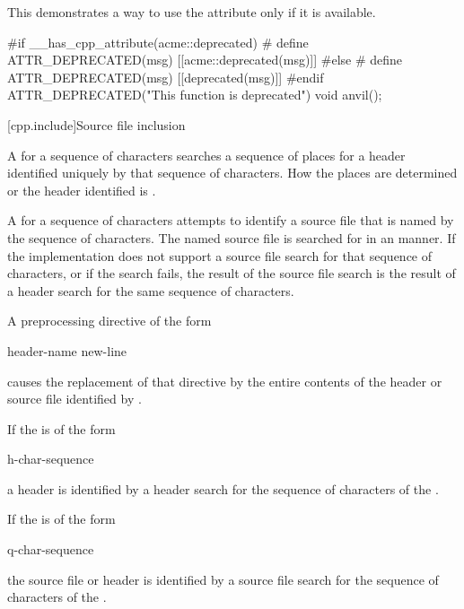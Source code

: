 \pnum
\begin{example}
This demonstrates a way to use the attribute 
only if it is available.
\begin{codeblock}
#if __has_cpp_attribute(acme::deprecated)
#  define ATTR_DEPRECATED(msg) [[acme::deprecated(msg)]]
#else
#  define ATTR_DEPRECATED(msg) [[deprecated(msg)]]
#endif
ATTR_DEPRECATED("This function is deprecated") void anvil();
\end{codeblock}
\end{example}

[cpp.include]{Source file inclusion}
%
%

\pnum
A  for a sequence of characters
searches a sequence of places for a header
identified uniquely by that sequence of characters.
How the places are determined or the header identified
is .

\pnum
A  for a sequence of characters
attempts to identify a source file that is named by the sequence of characters.
The named source file is searched for
in an  manner.
If the implementation does not support a source file search
for that sequence of characters, or if the search fails,
the result of the source file search
is the result of a header search for the same sequence of characters.

\pnum
A preprocessing directive of the form
\begin{ncsimplebnf}
 header-name new-line
\end{ncsimplebnf}
causes the replacement of that directive by the entire contents
of the header or source file identified by .

\pnum
If the  is of the form
\begin{ncsimplebnf}
\terminal{<} h-char-sequence \terminal{>}
\end{ncsimplebnf}
a header is identified by a header search for the sequence of characters
of the .

\pnum
If the  is of the form
\begin{ncsimplebnf}
 q-char-sequence 
\end{ncsimplebnf}
the source file or header is identified by a source file search
for the sequence of characters of the .

